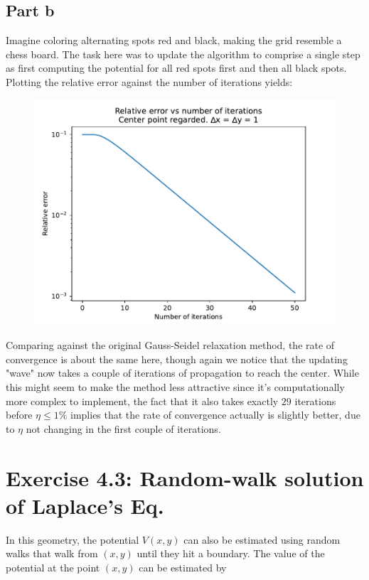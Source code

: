 \documentclass[a4paper,12pt]{article}
\begin{document}
\subsection*{Part b}

Imagine coloring alternating spots red and black, making the grid resemble a chess board. The task here was to
update the algorithm to comprise a single step as first computing the potential for all red spots first and then
all black spots. Plotting the relative error against the number of iterations yields:

\begin{figure}[!ht]
  \centering
  \includegraphics[scale=0.49]{img/4_2b_errorvsn_checker.pdf}
\end{figure}

Comparing against the original Gauss-Seidel relaxation method, the rate of convergence is about the same here, though
again we notice that the updating "wave" now takes a couple of iterations of propagation to reach the center. While
this might seem to make the method less attractive since it's computationally more complex to implement, the fact that
it also takes exactly $29$ iterations before $\eta \leq 1\%$ implies that the rate of convergence actually is slightly
better, due to $\eta$ not changing in the first couple of iterations.

\section*{Exercise 4.3: Random-walk solution of Laplace's Eq.}

In this geometry, the potential $V(x, y)$ can also be estimated using random walks that walk from $(x, y)$ until they
hit a boundary. The value of the potential at the point $(x, y)$ can be estimated by
\end{document}
